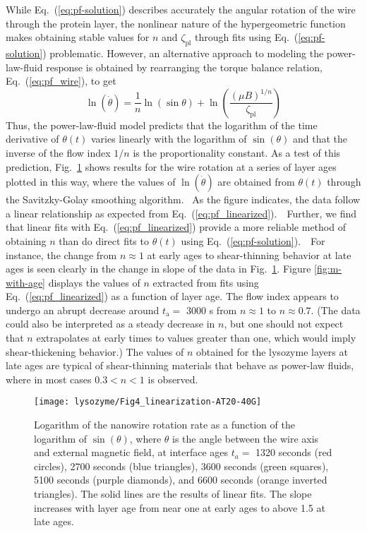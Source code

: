 While Eq.~(\ref{eq:pf-solution}) describes accurately the angular rotation of the wire through the protein layer, the nonlinear nature of the hypergeometric function makes obtaining stable values for $n$ and $\zeta_{\text{pl}}$ through fits using Eq.~(\ref{eq:pf-solution}) problematic.  However, an alternative approach to modeling the power-law-fluid response is obtained by rearranging the torque balance relation, Eq.~(\ref{eq:pf_wire}), to get
\begin{equation}
\label{eq:pf_linearized}
  \ln(\dot{\theta})= \frac{1}{n}\ln(\sin\theta) + \ln\left(\frac{(\mu B)^{1/n}}{\zeta_{\text{pl}}}\right)
\end{equation}
\noindent Thus, the power-law-fluid model predicts that the logarithm of the time derivative of $\theta(t)$ varies linearly with the logarithm of $\sin\left(\theta\right)$ and that the inverse of the flow index $1/n$ is the proportionality constant.  As a test of this prediction, Fig.~\ref{fig:linearization} shows results for the wire rotation at a series of layer ages plotted in this way, where the values of $\ln(\dot{\theta})$ are obtained from $\theta(t)$ through the Savitzky-Golay smoothing algorithm.~\cite{Savitzky1964}  As the figure indicates, the data follow a linear relationship as expected from Eq.~(\ref{eq:pf_linearized}).~~Further, we find that linear fits with Eq.~(\ref{eq:pf_linearized}) provide a more reliable method of obtaining $n$ than do direct fits to $\theta(t)$ using Eq.~(\ref{eq:pf-solution}).~~For instance, the change from $n \approx 1$ at early ages to shear-thinning behavior at late ages is seen clearly in the change in slope of the data in Fig.~\ref{fig:linearization}.  Figure \ref{fig:m-with-age} displays the values of $n$ extracted from fits using Eq.~(\ref{eq:pf_linearized}) as a function of layer age.  The flow index appears to undergo an abrupt decrease around $t_{\text{a}} = $ 3000 s from $n \approx 1$ to $n \approx 0.7$.  (The data could also be interpreted as a steady decrease in $n$, but one should not expect that $n$ extrapolates at early times to values greater than one, which would imply shear-thickening behavior.)  The values of $n$ obtained for the lysozyme layers at late ages are typical of shear-thinning materials that behave as power-law fluids, where in most cases $0.3 < n < 1$ is observed.~\cite{Huang1998a, Larrard1998}   

\begin{figure}
  \texttt{[image: lysozyme/Fig4\_linearization-AT20-40G]}
 \caption{\label{fig:linearization}  Logarithm of the nanowire rotation rate as a function of the logarithm of $\sin(\theta)$, where $\theta$ is the angle between the wire axis and external magnetic field, at interface ages $t_a =$ 1320 seconds (red circles), 2700 seconds (blue triangles), 3600 seconds (green squares), 5100 seconds (purple diamonds), and 6600 seconds (orange inverted triangles).  The solid lines are the results of linear fits. The slope increases with layer age from near one at early ages to above 1.5 at late ages.}
\end{figure}

